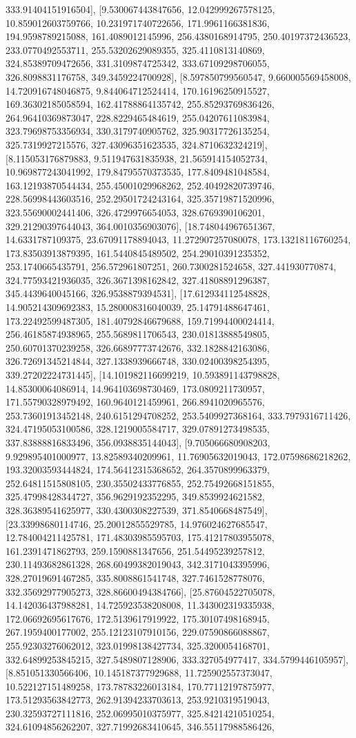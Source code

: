 333.91404151916504], [9.530067443847656, 12.042999267578125, 10.859012603759766, 10.231971740722656, 171.9961166381836, 194.9598789215088, 161.4089012145996, 256.4380168914795, 250.40197372436523, 233.0770492553711, 255.53202629089355, 325.4110813140869, 324.85389709472656, 331.3109874725342, 333.67109298706055, 326.8098831176758, 349.3459224700928], [8.597850799560547, 9.660005569458008, 14.720916748046875, 9.844064712524414, 170.16196250915527, 169.36302185058594, 162.41788864135742, 255.85293769836426, 264.96410369873047, 228.8229465484619, 255.04207611083984, 323.79698753356934, 330.3179740905762, 325.90317726135254, 325.7319927215576, 327.43096351623535, 324.8710632324219], [8.115053176879883, 9.511947631835938, 21.565914154052734, 10.969877243041992, 179.84795570373535, 177.8409481048584, 163.12193870544434, 255.45001029968262, 252.40492820739746, 228.56998443603516, 252.29501724243164, 325.35719871520996, 323.55690002441406, 326.4729976654053, 328.6769390106201, 329.21290397644043, 364.0010356903076], [18.748044967651367, 14.6331787109375, 23.67091178894043, 11.272907257080078, 173.13218116760254, 173.83503913879395, 161.5440845489502, 254.29010391235352, 253.1740665435791, 256.572961807251, 260.7300281524658, 327.441930770874, 324.77593421936035, 326.3671398162842, 327.41808891296387, 345.4439640045166, 326.9538879394531], [17.612934112548828, 14.905214309692383, 15.280008316040039, 25.14791488647461, 173.22492599487305, 181.40792846679688, 159.71994400024414, 256.46185874938965, 255.5689811706543, 230.01813888549805, 250.60701370239258, 326.66897773742676, 332.1828842163086, 326.72691345214844, 327.1338939666748, 330.02400398254395, 339.27202224731445], [14.101982116699219, 10.593891143798828, 14.85300064086914, 14.964103698730469, 173.0809211730957, 171.55790328979492, 160.9640121459961, 266.8941020965576, 253.73601913452148, 240.6151294708252, 253.5409927368164, 333.7979316711426, 324.47195053100586, 328.1219005584717, 329.07891273498535, 337.83888816833496, 356.0938835144043], [9.705066680908203, 9.929895401000977, 13.82589340209961, 11.76905632019043, 172.07598686218262, 193.32003593444824, 174.56412315368652, 264.3570899963379, 252.64811515808105, 230.35502433776855, 252.75492668151855, 325.47998428344727, 356.9629192352295, 349.8539924621582, 328.36389541625977, 330.4300308227539, 371.8540668487549], [23.33998680114746, 25.20012855529785, 14.976024627685547, 12.784004211425781, 171.48303985595703, 175.41217803955078, 161.2391471862793, 259.1590881347656, 251.54495239257812, 230.11493682861328, 268.60499382019043, 342.3171043395996, 328.27019691467285, 335.8008861541748, 327.7461528778076, 332.35692977905273, 328.86600494384766], [25.87604522705078, 14.142036437988281, 14.725923538208008, 11.343002319335938, 172.06692695617676, 172.5139617919922, 175.30107498168945, 267.1959400177002, 255.12123107910156, 229.07590866088867, 255.92303276062012, 323.01998138427734, 325.3200054168701, 332.64899253845215, 327.5489807128906, 333.327054977417, 334.5799446105957], [8.851051330566406, 10.145187377929688, 11.725902557373047, 10.522127151489258, 173.78783226013184, 170.77112197875977, 173.51293563842773, 262.91394233703613, 253.9210319519043, 230.32593727111816, 252.06995010375977, 325.84214210510254, 324.61094856262207, 327.71992683410645, 346.55117988586426, 